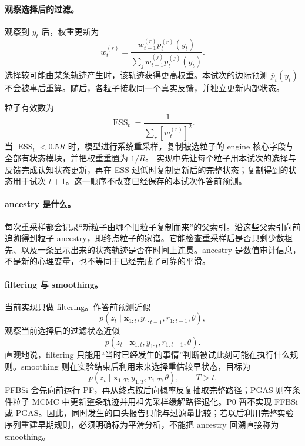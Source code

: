 \paragraph{观察选择后的过滤。}
观察到 $y_t$ 后，权重更新为
\begin{equation}
w_t^{(r)}
=
\frac{w_{t-1}^{(r)}p_t^{(r)}(y_t)}
{\sum_jw_{t-1}^{(j)}p_t^{(j)}(y_t)}.
\label{eq:m0815-pf-weight}
\end{equation}
选择较可能由某条轨迹产生时，该轨迹获得更高权重。本试次的边际预测
$\overline p_t(y_t)$ 不会被事后重算。随后，各粒子接收同一个真实反馈，并独立更新内部状态。

粒子有效数为
\begin{equation}
\operatorname{ESS}_t
=\frac{1}{\sum_r[w_t^{(r)}]^2}.
\label{eq:m0815-ess}
\end{equation}
当 $\operatorname{ESS}_t<0.5R$ 时，模型进行系统重采样，复制被选粒子的 engine 核心字段与全部有状态模块，并把权重重置为 $1/R$。
实现中先让每个粒子用本试次的选择与反馈完成认知状态更新，再在 ESS 过低时复制更新后的完整状态；复制得到的状态用于试次 $t+1$。这一顺序不改变已经保存的本试次作答前预测。

\paragraph{ancestry 是什么。}
每次重采样都会记录“新粒子由哪个旧粒子复制而来”的父索引。沿这些父索引向前追溯得到粒子 ancestry，即终点粒子的家谱。它能检查重采样后是否只剩少数祖先、以及一条显示出来的状态轨迹是否在时间上连贯。ancestry 是数值审计信息，不是新的心理变量，也不等同于已经完成了可靠的平滑。

\paragraph{filtering 与 smoothing。}
当前实现只做 filtering。作答前预测近似
\begin{equation}
p(z_t\mid \mathbf x_{1:t},y_{1:t-1},r_{1:t-1},\theta),
\label{eq:m0815-predictive-filter}
\end{equation}
观察当前选择后的过滤状态近似
\begin{equation}
p(z_t\mid \mathbf x_{1:t},y_{1:t},r_{1:t-1},\theta).
\label{eq:m0815-filtered-state}
\end{equation}
直观地说，filtering 只能用“当时已经发生的事情”判断被试此刻可能在执行什么规则。smoothing 则在实验结束后利用未来选择重估较早状态，目标为
\begin{equation}
p(z_t\mid \mathbf x_{1:T},y_{1:T},r_{1:T},\theta),
\qquad T>t.
\label{eq:m0815-smoothed-state}
\end{equation}
FFBSi 会先向前运行 PF，再从终点按后向概率反复抽取完整路径；PGAS 则在条件粒子 MCMC 中更新整条轨迹并用祖先采样缓解路径退化。P0 暂不实现 FFBSi 或 PGAS。因此，同时发生的口头报告只能与过滤量比较；若以后利用完整实验序列重建早期规则，必须明确标为平滑分析，不能把 ancestry 回溯直接称为 smoothing。


